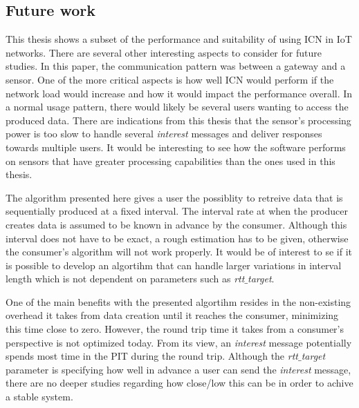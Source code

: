 \subsection{Future work}
This thesis shows a subset of the performance and suitability of using ICN in IoT networks. There are several other interesting aspects to consider for future studies. 
In this paper, the communication pattern was between a gateway and a sensor. One of the more critical aspects is how well ICN would perform if the network load would increase and how it would impact the performance overall. 
In a normal usage pattern, there would likely be several users wanting to access the produced data. There are indications from this thesis that the sensor's processing power is too slow to handle several \textit{interest} messages and deliver responses towards multiple users. It would be interesting to see how the software performs on sensors that have greater processing capabilities than the ones used in this thesis.

The algorithm presented here gives a user the possiblity to retreive data that is sequentially produced at a fixed interval. The interval rate at when the producer creates data is assumed to be known in advance by the consumer. Although this interval does not have to be exact, a rough estimation has to be given, otherwise the consumer's algorithm will not work properly. %
It would be of interest to se if it is possible to develop an algortihm that can handle larger variations in interval length which is not dependent on parameters such as \textit{rtt$\_$target}.

One of the main benefits with the presented algortihm resides in the non-existing overhead it takes from data creation until it reaches the consumer, minimizing this time close to zero. However, the round trip time it takes from a consumer's perspective is not optimized today. From its view, an \textit{interest} message potentially spends most time in the PIT during the round trip.
Although the \textit{rtt$\_$target} parameter is specifying how well in advance a user can send the \textit{interest} message, there are no deeper studies regarding how close/low this can be in order to achive a stable system. 

